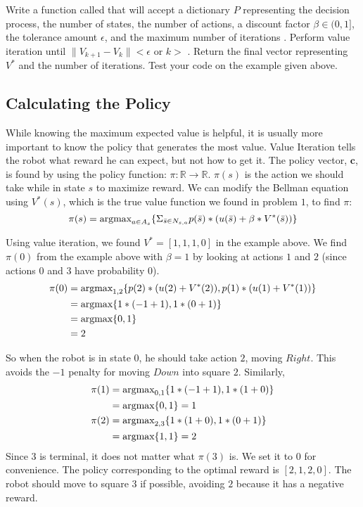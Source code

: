 \begin{problem}
\label{prob:policyiter-value1}
Write a function called  that will accept a dictionary $P$ representing the decision process, the number of states, the number of actions, a discount factor $\beta \in (0,1]$,
the tolerance amount $\epsilon$, and the maximum number of iterations .
Perform value iteration until $\|V_{k+1} - V_{k}\| < \epsilon$ or $k > $ .
Return the final vector representing $V^*$ and the number of iterations.
Test your code on the example given above.
\end{problem}

\subsection*{Calculating the Policy}

While knowing the maximum expected value is helpful, it is usually more important to know the policy that generates the most value.
Value Iteration tells the robot what reward he can expect, but not how to get it.
The policy vector, $\mathbf{c}$, is found by using the policy function: $\pi : \mathbb{R} \to \mathbb{R}$.
$\pi(s)$ is the action we should take while in state $s$ to maximize reward.
We can modify the Bellman equation using $V^*(s)$, which is the true value function we found in problem $1$, to find $\pi$:
\begin{equation}
\label{eq:policyiter-pol_func}
\pi(s) = \mbox{argmax}_{a \in A_s} \{\Sigma_{\bar{s}\in N_{s,a}} p(\bar{s})*(u(\bar{s}) + \beta*V^*(\bar{s}))\}
\end{equation}

Using value iteration, we found $V^*  = [1, 1, 1, 0]$ in the example above.
We find $\pi(0)$ from the example above with $\beta = 1$ by looking at actions $1$ and $2$ (since actions 0 and 3 have probability 0).
\begin{align*}
\pi(0) &=\mbox{argmax}_{1,2} \{p(2)*(u(2) + V^*(2)), p(1)*(u(1)+V^*(1))\} \\
&= \mbox{argmax} \{1*(-1+1), 1*(0+1)\} \\
&= \mbox{argmax}\{0, 1\}\\
&= 2
\end{align*}

So when the robot is in state $0$, he should take action $2$, moving $Right$.
This avoids the $-1$ penalty for moving $Down$ into square $2$.
Similarly,
\begin{align*}
\pi(1) &= \mbox{argmax}_{0,1} \{1*(-1+1), 1*(1+0)\} \\
&= \mbox{argmax} \{0, 1\} = 1 \\
\pi(2) &= \mbox{argmax}_{2,3} \{1*(1+0), 1*(0+1)\} \\
&= \mbox{argmax} \{1, 1\} = 2
\end{align*}
Since $3$ is terminal, it does not matter what $\pi(3)$ is.
We set it to $0$ for convenience.
The policy corresponding to the optimal reward is $[2,1,2,0]$.
The robot should move to square $3$ if possible, avoiding $2$ because it has a negative reward.

